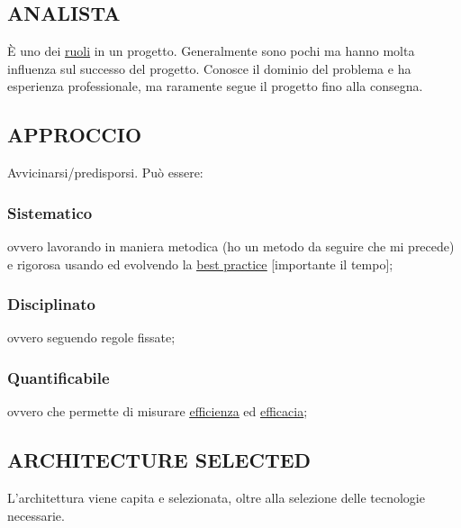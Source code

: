 		
		
		\subsection{ANALISTA}  \label{analista}
		È uno dei \underline{\hyperref[ruoli]{ruoli}} in un progetto. Generalmente sono pochi ma hanno molta influenza sul successo del progetto. Conosce il dominio del problema e ha esperienza professionale, ma raramente segue il progetto fino alla consegna.
		
		\subsection{APPROCCIO} \label{approccio} 
		Avvicinarsi/predisporsi. Può essere:
			\subsubsection{Sistematico} \label{sistematico}
			ovvero lavorando in maniera metodica (ho un metodo da seguire che mi precede) e rigorosa usando ed evolvendo la \underline{\hyperref[best]{best practice}} [importante il tempo];
			\subsubsection{Disciplinato} \label{disciplinato}
			ovvero seguendo regole fissate;
			\subsubsection{Quantificabile} \label{quantificabile}
			ovvero che permette di misurare \underline{\hyperref[efficienza]{efficienza}} ed \underline{\hyperref[efficacia]{efficacia}};
			
		\subsection{ARCHITECTURE SELECTED}		\label{architectureselected}
		L'architettura viene capita e selezionata, oltre alla selezione delle tecnologie necessarie.	
			
